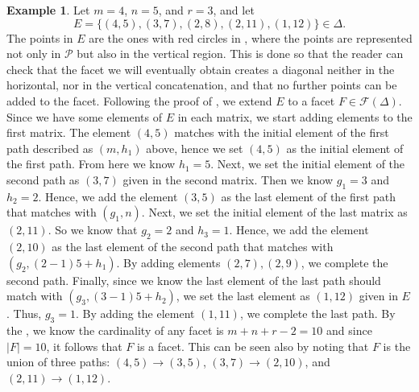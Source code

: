 \documentclass[12pt]{amsart}
\numberwithin{equation}{section}
\theoremstyle{definition}
\newtheorem{example}[theorem]{Example}
\begin{document}
\begin{example}
\label{ex:complete-faces}
Let $m=4$, $n=5$, and $r=3$, and let 
$$E=\{(4,5),(3,7),(2,8),(2,11),(1,12)\}\in\Delta.$$
The points in $E$ are the ones with red circles in , where the points are represented  not only in $\mathcal{P}$ but also in the vertical region. This is done so that the reader can check that the facet we will eventually obtain creates a diagonal neither in the horizontal, nor in the vertical concatenation, and that no further points can be added to the facet. Following the proof of , we extend $E$ to a facet $F\in\mathcal{F}(\Delta)$. Since we have some elements of $E$ in each matrix, we start adding elements to the first matrix. The element $(4,5)$ matches with the initial element of the first path described as $(m,h_1)$ above, hence we set $(4,5)$ as the initial element of the first path. From here we know $h_1=5$. Next, we set the initial element of the second path as $(3,7)$ given in the second matrix. Then we know $g_1=3$ and $h_2=2$. Hence, we add the element $(3,5)$ as the last element of the first path that matches with $(g_1,n)$. Next, we set the initial element of the last matrix as $(2,11)$. So we know that $g_2=2$ and $h_3=1$. Hence, we add the element $(2,10)$ as the last element of the second path that matches with $(g_2,(2-1)5+h_1)$. By adding elements $(2,7), (2,9)$, we complete the second path. Finally, since we know the last element of the last path should match with $(g_3,(3-1)5+h_2)$, we set the last element as $(1,12)$ given in $E$. Thus, $g_3=1$. By adding the element $(1,11)$, we complete the last path. By the , we know the cardinality of any facet is $m+n+r-2=10$ and since $|F|=10$, it follows that $F$ is a facet. This can be seen also by noting that $F$ is the union of three paths: $(4,5)\longrightarrow (3,5)$, $(3,7)\longrightarrow (2,10)$, and $(2,11)\longrightarrow (1,12)$.
\begin{figure}[h]
\end{figure}
\end{example}
\end{document}
